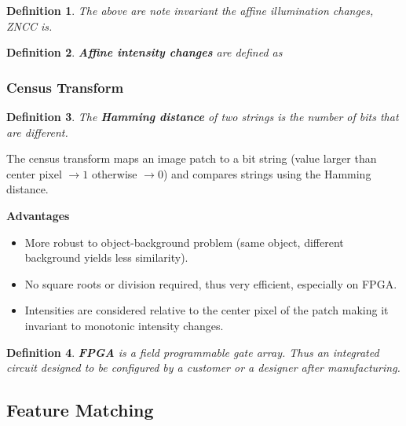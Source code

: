 \documentclass[10pt,a4paper]{scrartcl}
\newtheorem{define}{Definition}
\begin{document}
\begin{multicols*}{2}
\begin{define}

The above are note invariant the affine illumination changes, ZNCC is.

\end{define}

\begin{define}
\textbf{Affine intensity changes} are defined as 

\end{define}

\subsubsection{Census Transform}

\begin{define}
The \textbf{Hamming distance} of two strings is the number of bits that are different.
\end{define}

The census transform maps an image patch to a bit string (value larger than center pixel $\rightarrow 1$ otherwise $\rightarrow 0$) and compares strings using the Hamming distance.


\textbf{Advantages}
\begin{itemize}
\item More robust to object-background problem (same object, different background yields less similarity).
\item No square roots or division required, thus very efficient, especially on FPGA. 
\item Intensities are considered relative to the center pixel of the patch making it invariant to monotonic intensity changes.
\end{itemize}

\begin{define}
\textbf{FPGA} is a field programmable gate array. Thus an  integrated circuit designed to be configured by a customer or a designer after manufacturing.
\end{define}

\subsection{Feature Matching}


\end{multicols*}
\end{document}
